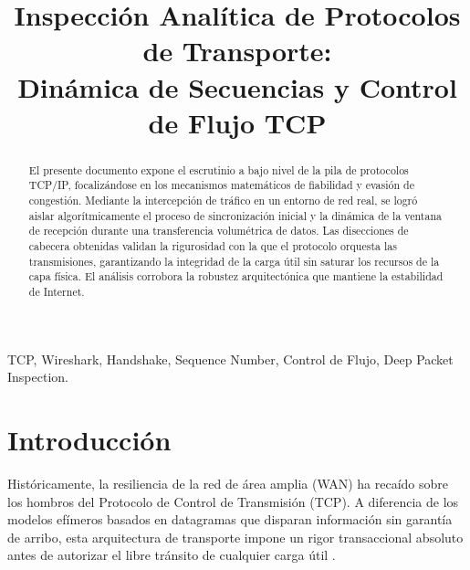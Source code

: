 \documentclass[conference]{IEEEtran}
\begin{document}
\title{Inspección Analítica de Protocolos de Transporte: \\ Dinámica de Secuencias y Control de Flujo TCP}

\author{
}

\maketitle

\begin{abstract}
El presente documento expone el escrutinio a bajo nivel de la pila de protocolos TCP/IP, focalizándose en los mecanismos matemáticos de fiabilidad y evasión de congestión. Mediante la intercepción de tráfico en un entorno de red real, se logró aislar algorítmicamente el proceso de sincronización inicial y la dinámica de la ventana de recepción durante una transferencia volumétrica de datos. Las disecciones de cabecera obtenidas validan la rigurosidad con la que el protocolo orquesta las transmisiones, garantizando la integridad de la carga útil sin saturar los recursos de la capa física. El análisis corrobora la robustez arquitectónica que mantiene la estabilidad de Internet.
\end{abstract}

\begin{IEEEkeywords}
TCP, Wireshark, Handshake, Sequence Number, Control de Flujo, Deep Packet Inspection.
\end{IEEEkeywords}

\section{Introducción}
Históricamente, la resiliencia de la red de área amplia (WAN) ha recaído sobre los hombros del Protocolo de Control de Transmisión (TCP). A diferencia de los modelos efímeros basados en datagramas que disparan información sin garantía de arribo, esta arquitectura de transporte impone un rigor transaccional absoluto antes de autorizar el libre tránsito de cualquier carga útil \cite{kozierok2005}.
\end{document}
